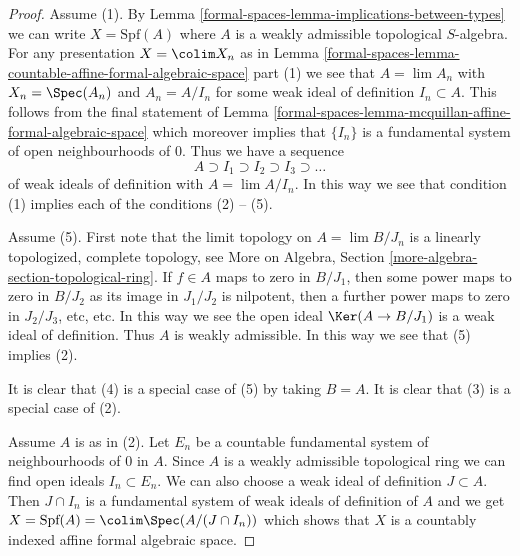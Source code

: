\begin{proof}
Assume (1). By Lemma \ref{formal-spaces-lemma-implications-between-types}
we can write $X = \text{Spf}(A)$ where $A$ is a weakly admissible
topological $S$-algebra. For any presentation $X = \colim X_n$ as in
Lemma \ref{formal-spaces-lemma-countable-affine-formal-algebraic-space} part (1)
we see that $A = \lim A_n$ with $X_n = \Spec(A_n)$ and
$A_n = A/I_n$ for some weak ideal of definition $I_n \subset A$.
This follows from the final statement of
Lemma \ref{formal-spaces-lemma-mcquillan-affine-formal-algebraic-space}
which moreover implies that $\{I_n\}$ is a fundamental system
of open neighbourhoods of $0$. Thus we have a sequence
$$
A \supset I_1 \supset I_2 \supset I_3 \supset \ldots
$$
of weak ideals of definition with $A = \lim A/I_n$. In this way
we see that condition (1) implies each of the conditions (2) -- (5).

\medskip\noindent
Assume (5). First note that the limit topology on
$A = \lim B/J_n$ is a linearly topologized, complete topology, see
More on Algebra, Section \ref{more-algebra-section-topological-ring}.
If $f \in A$ maps to zero in $B/J_1$, then some power maps to zero
in $B/J_2$ as its image in $J_1/J_2$ is nilpotent, then a further
power maps to zero in $J_2/J_3$, etc, etc. In this way we see
the open ideal $\Ker(A \to B/J_1)$ is a weak ideal of definition.
Thus $A$ is weakly admissible. In this way we see that (5) implies (2).

\medskip\noindent
It is clear that (4) is a special case of (5) by taking $B = A$.
It is clear that (3) is a special case of (2).

\medskip\noindent
Assume $A$ is as in (2). Let $E_n$ be a countable fundamental
system of neighbourhoods of $0$ in $A$. Since $A$ is a weakly
admissible topological ring we can find open ideals $I_n \subset E_n$.
We can also choose a weak ideal of definition $J \subset A$.
Then $J \cap I_n$ is a fundamental system of weak ideals of definition
of $A$ and we get
$X = \text{Spf}(A) = \colim \Spec(A/(J \cap I_n))$
which shows that $X$ is a countably indexed affine formal algebraic space.
\end{proof}

